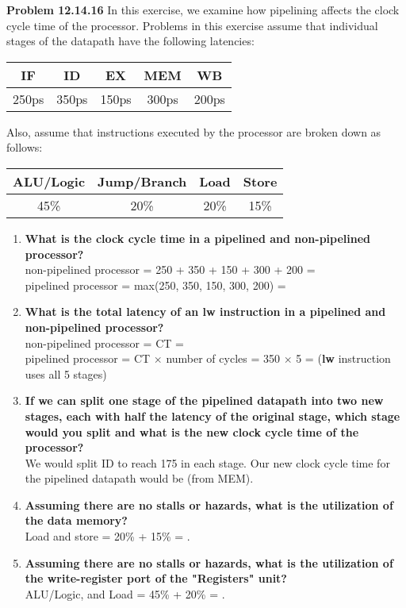 \documentclass{article}
\begin{document}
    \noindent\textbf{Problem 12.14.16} In this exercise, we examine how pipelining affects the clock cycle time of the processor. Problems in this exercise assume that individual stages of the datapath have the following latencies:

    \begin{center}
        \begin{tabular}{c|c|c|c|c}
            IF & ID & EX & MEM & WB \\
            \hline
            250ps & 350ps & 150ps & 300ps & 200ps
        \end{tabular}
    \end{center}

    \noindent Also, assume that instructions executed by the processor are broken down as follows:

    \begin{center}
        \begin{tabular}{c|c|c|c}
            ALU/Logic & Jump/Branch & Load & Store \\
            \hline
            45\% & 20\% & 20\% & 15\%
        \end{tabular}
    \end{center}

    \begin{enumerate}[label=\textbf{(\alph*)}]
        \item \textbf{What is the clock cycle time in a pipelined and non-pipelined processor?}
        \\ non-pipelined processor = 250 + 350 + 150 + 300 + 200 = 
        \\ pipelined processor = max(250, 350, 150, 300, 200) = 
        \item \textbf{What is the total latency of an lw instruction in a pipelined and non-pipelined processor?}
        \\ non-pipelined processor = CT = 
        \\ pipelined processor = CT $\times$ number of cycles = 350 $\times$ 5 =  (\textbf{lw} instruction uses all 5 stages)
        \item \textbf{If we can split one stage of the pipelined datapath into two new stages, each with half the latency of the original stage, which stage would you split and what is the new clock cycle time of the processor?}
        \\ We would split ID to reach 175 in each stage. Our new clock cycle time for the pipelined datapath would be  (from MEM).
        \item \textbf{Assuming there are no stalls or hazards, what is the utilization of the data memory?}
        \\ Load and store = 20\% + 15\% = .
        \item \textbf{Assuming there are no stalls or hazards, what is the utilization of the write-register port of the "Registers" unit?}
        \\ ALU/Logic, and Load = 45\% + 20\% = .
    \end{enumerate}
\end{document}
